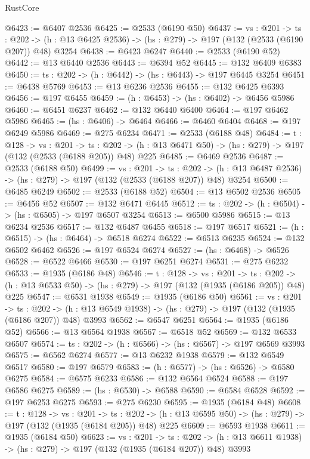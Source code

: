 \begin{lexlean}{RustCore}
\begin{coremodule}
@6423 := @6407 @2536
@6425 := @2533 (@6190 @50)
@6437 := {vs : @201} ->
  {ts : @202} -> (h : @13 @6425 @2536) -> (hs : @279) -> @197 (@132 (@2533 (@6190 @207)) @48) @3254
@6438 := @6423 @6247
@6440 := @2533 (@6190 @52)
@6442 := @13 @6440 @2536
@6443 := @6394 @52
@6445 := @132 @6409 @6383
@6450 := {ts : @202} -> (h : @6442) -> (hs : @6443) -> @197 @6445 @3254
@6451 := @6438 @5769
@6453 := @13 @6236 @2536
@6455 := @132 @6425 @6393
@6456 := @197 @6455
@6459 := (h : @6453) -> (hs : @6402) -> @6456 @5986
@6460 := @6451 @6237
@6462 := @132 @6440 @6400
@6464 := @197 @6462 @5986
@6465 := (hs : @6406) -> @6464
@6466 := @6460 @6404
@6468 := @197 @6249 @5986
@6469 := @275 @6234
@6471 := @2533 (@6188 @48)
@6484 := {t : @128} ->
  {vs : @201} ->
  {ts : @202} -> (h : @13 @6471 @50) -> (hs : @279) -> @197 (@132 (@2533 (@6188 @205)) @48) @225
@6485 := @6469 @2536
@6487 := @2533 (@6188 @50)
@6499 := {vs : @201} ->
  {ts : @202} -> (h : @13 @6487 @2536) -> (hs : @279) -> @197 (@132 (@2533 (@6188 @207)) @48) @3254
@6500 := @6485 @6249
@6502 := @2533 (@6188 @52)
@6504 := @13 @6502 @2536
@6505 := @6456 @52
@6507 := @132 @6471 @6445
@6512 := {ts : @202} -> (h : @6504) -> (hs : @6505) -> @197 @6507 @3254
@6513 := @6500 @5986
@6515 := @13 @6234 @2536
@6517 := @132 @6487 @6455
@6518 := @197 @6517
@6521 := (h : @6515) -> (hs : @6464) -> @6518 @6274
@6522 := @6513 @6235
@6524 := @132 @6502 @6462
@6526 := @197 @6524 @6274
@6527 := (hs : @6468) -> @6526
@6528 := @6522 @6466
@6530 := @197 @6251 @6274
@6531 := @275 @6232
@6533 := @1935 (@6186 @48)
@6546 := {t : @128} ->
  {vs : @201} ->
  {ts : @202} -> (h : @13 @6533 @50) -> (hs : @279) -> @197 (@132 (@1935 (@6186 @205)) @48) @225
@6547 := @6531 @1938
@6549 := @1935 (@6186 @50)
@6561 := {vs : @201} ->
  {ts : @202} -> (h : @13 @6549 @1938) -> (hs : @279) -> @197 (@132 (@1935 (@6186 @207)) @48) @3993
@6562 := @6547 @6251
@6564 := @1935 (@6186 @52)
@6566 := @13 @6564 @1938
@6567 := @6518 @52
@6569 := @132 @6533 @6507
@6574 := {ts : @202} -> (h : @6566) -> (hs : @6567) -> @197 @6569 @3993
@6575 := @6562 @6274
@6577 := @13 @6232 @1938
@6579 := @132 @6549 @6517
@6580 := @197 @6579
@6583 := (h : @6577) -> (hs : @6526) -> @6580 @6275
@6584 := @6575 @6233
@6586 := @132 @6564 @6524
@6588 := @197 @6586 @6275
@6589 := (hs : @6530) -> @6588
@6590 := @6584 @6528
@6592 := @197 @6253 @6275
@6593 := @275 @6230
@6595 := @1935 (@6184 @48)
@6608 := {t : @128} ->
  {vs : @201} ->
  {ts : @202} -> (h : @13 @6595 @50) -> (hs : @279) -> @197 (@132 (@1935 (@6184 @205)) @48) @225
@6609 := @6593 @1938
@6611 := @1935 (@6184 @50)
@6623 := {vs : @201} ->
  {ts : @202} -> (h : @13 @6611 @1938) -> (hs : @279) -> @197 (@132 (@1935 (@6184 @207)) @48) @3993

\end{coremodule}
\end{lexlean}
